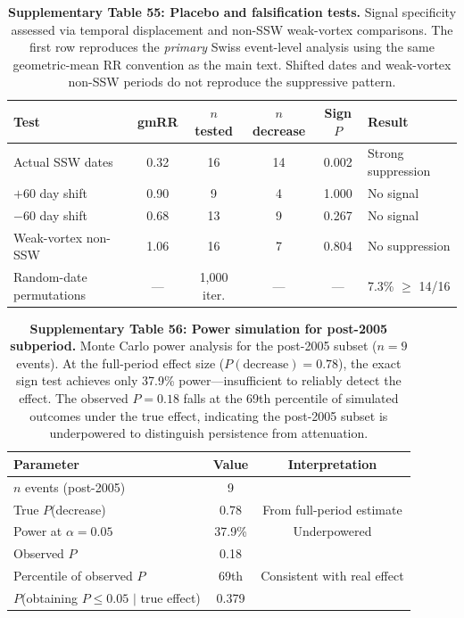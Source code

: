 \documentclass[11pt,letterpaper]{article}
\begin{document}

\begin{table}[!ht]
\centering
\caption{\textbf{Supplementary Table 55: Placebo and falsification tests.}
Signal specificity assessed via temporal displacement and non-SSW weak-vortex comparisons. The first row reproduces the \emph{primary} Swiss event-level analysis using the same geometric-mean RR convention as the main text. Shifted dates and weak-vortex non-SSW periods do not reproduce the suppressive pattern.}
\label{tab:placebo}
\small
\begin{tabular}{lccccl}
\toprule
Test & gmRR & $n$ tested & $n$ decrease & Sign $P$ & Result \\
\midrule
Actual SSW dates & 0.32 & 16 & 14 & 0.002 & Strong suppression \\
$+$60 day shift & 0.90 & 9 & 4 & 1.000 & No signal \\
$-$60 day shift & 0.68 & 13 & 9 & 0.267 & No signal \\
Weak-vortex non-SSW & 1.06 & 16 & 7 & 0.804 & No suppression \\
Random-date permutations & --- & 1,000 iter. & --- & --- & 7.3\% $\geq$ 14/16 \\
\bottomrule
\end{tabular}
\end{table}

\begin{table}[!ht]
\centering
\caption{\textbf{Supplementary Table 56: Power simulation for post-2005 subperiod.}
Monte Carlo power analysis for the post-2005 subset ($n = 9$ events). At the full-period effect size ($P(\mathrm{decrease}) = 0.78$), the exact sign test achieves only 37.9\% power---insufficient to reliably detect the effect. The observed $P = 0.18$ falls at the 69th percentile of simulated outcomes under the true effect, indicating the post-2005 subset is underpowered to distinguish persistence from attenuation.}
\label{tab:power_sim_post2005}
\small
\begin{tabular}{lcc}
\toprule
Parameter & Value & Interpretation \\
\midrule
$n$ events (post-2005) & 9 & \\
True $P$(decrease) & 0.78 & From full-period estimate \\
Power at $\alpha = 0.05$ & 37.9\% & Underpowered \\
Observed $P$ & 0.18 & \\
Percentile of observed $P$ & 69th & Consistent with real effect \\
$P$(obtaining $P \leq 0.05$ $|$ true effect) & 0.379 & \\
\bottomrule
\end{tabular}
\end{table}
\end{document}
